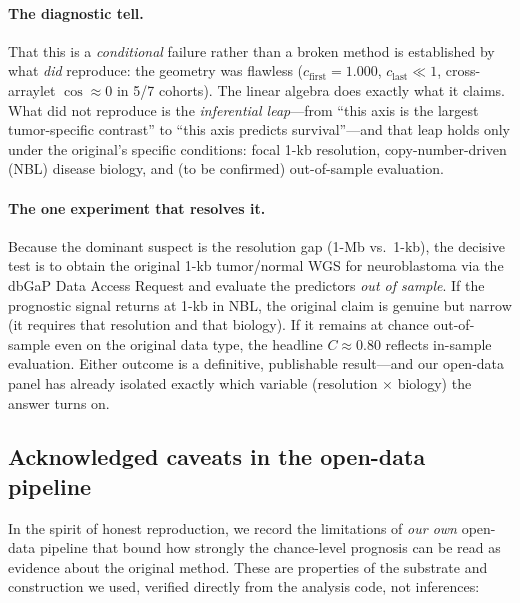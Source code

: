 \documentclass[11pt]{article}
\begin{document}
\paragraph{The diagnostic tell.} That this is a \emph{conditional} failure rather
than a broken method is established by what \emph{did} reproduce: the geometry was
flawless ($c_{\text{first}} = 1.000$, $c_{\text{last}} \ll 1$, cross-arraylet
$\cos \approx 0$ in 5/7 cohorts). The linear algebra does exactly what it claims.
What did not reproduce is the \emph{inferential leap}---from ``this axis is the
largest tumor-specific contrast'' to ``this axis predicts survival''---and that
leap holds only under the original's specific conditions: focal 1-kb resolution,
copy-number-driven (NBL) disease biology, and (to be confirmed) out-of-sample
evaluation.

\paragraph{The one experiment that resolves it.} Because the dominant suspect is
the resolution gap (1-Mb vs.\ 1-kb), the decisive test is to obtain the original
1-kb tumor/normal WGS for neuroblastoma via the dbGaP Data Access Request and
evaluate the predictors \emph{out of sample}. If the prognostic signal returns at
1-kb in NBL, the original claim is genuine but narrow (it requires that
resolution and that biology). If it remains at chance out-of-sample even on the
original data type, the headline $C \approx 0.80$ reflects in-sample evaluation.
Either outcome is a definitive, publishable result---and our open-data panel has
already isolated exactly which variable (resolution $\times$ biology) the answer
turns on.

\subsection{Acknowledged caveats in the open-data pipeline}

In the spirit of honest reproduction, we record the limitations of \emph{our own}
open-data pipeline that bound how strongly the chance-level prognosis can be read
as evidence about the original method. These are properties of the substrate and
construction we used, verified directly from the analysis code, not inferences:
\end{document}
